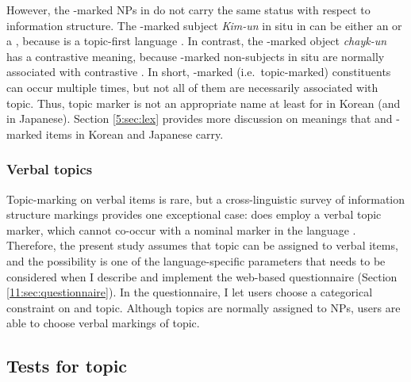 
\noindent However, the \onun-marked NPs in
 do not carry the same status with
respect to information structure. The \onun-marked subject
\textit{Kim-un} in situ in 
can be either an  or a , because
 is a topic-first language \citep{sohn:01}. In contrast,
the \onun-marked object \textit{chayk-un} has a contrastive meaning,
because \onun-marked non-subjects in situ are normally
associated with contrastive  \citep{choi:99,song:bender:11}. In
short, \onun-marked (i.e.\ topic-marked) constituents can occur
multiple times, but not all of them are necessarily associated with
topic.  Thus, topic marker is not an appropriate name at least for
\nun in Korean (and \wa in Japanese). Section \ref{5:sec:lex} provides more
discussion on meanings that \nun and \wa-marked items in Korean and
Japanese carry.





\subsubsection{Verbal topics}
\label{3:sssec:verbal-topics}


Topic-marking on verbal items is rare, but a cross-linguistic survey
of information structure markings provides one exceptional case:
 does employ a verbal topic marker, which cannot
co-occur with a nominal  marker in the language
\citep{chapman:81}. Therefore, the present study assumes that topic
can be assigned to verbal items, and the possibility is one of the
language-specific parameters that needs to be considered when I
describe and implement the web-based questionnaire
(Section \ref{11:sec:questionnaire}). In the questionnaire, I let users choose
a categorical constraint on  and topic. Although topics are
normally assigned to NPs, users are able to choose verbal markings of
topic.




\subsection{Tests for topic}
\label{3:ssec:tests-topic}

